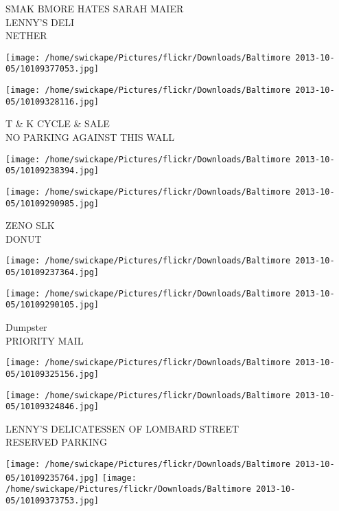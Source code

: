 \documentclass[10pt,letterpaper]{article}
\begin{document}
SMAK BMORE HATES SARAH MAIER\\
LENNY'S DELI\\
NETHER\\
\pagebreak

\texttt{[image: /home/swickape/Pictures/flickr/Downloads/Baltimore 2013-10-05/10109377053.jpg]}

\vspace{0.25in}
\texttt{[image: /home/swickape/Pictures/flickr/Downloads/Baltimore 2013-10-05/10109328116.jpg]}

T \& K CYCLE \& SALE\\
NO PARKING AGAINST THIS WALL\\
\pagebreak

\texttt{[image: /home/swickape/Pictures/flickr/Downloads/Baltimore 2013-10-05/10109238394.jpg]}

\vspace{0.25in}
\texttt{[image: /home/swickape/Pictures/flickr/Downloads/Baltimore 2013-10-05/10109290985.jpg]}

ZENO SLK\\
DONUT\\
\pagebreak

\texttt{[image: /home/swickape/Pictures/flickr/Downloads/Baltimore 2013-10-05/10109237364.jpg]}

\vspace{0.25in}
\texttt{[image: /home/swickape/Pictures/flickr/Downloads/Baltimore 2013-10-05/10109290105.jpg]}

Dumpster\\
PRIORITY MAIL\\
\pagebreak

\texttt{[image: /home/swickape/Pictures/flickr/Downloads/Baltimore 2013-10-05/10109325156.jpg]}

\vspace{0.25in}
\texttt{[image: /home/swickape/Pictures/flickr/Downloads/Baltimore 2013-10-05/10109324846.jpg]}

LENNY'S DELICATESSEN OF LOMBARD STREET\\
RESERVED PARKING\\
\pagebreak

\texttt{[image: /home/swickape/Pictures/flickr/Downloads/Baltimore 2013-10-05/10109235764.jpg]}
\texttt{[image: /home/swickape/Pictures/flickr/Downloads/Baltimore 2013-10-05/10109373753.jpg]}
\end{document}
